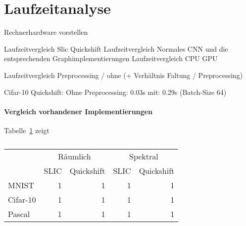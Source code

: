 \section{Laufzeitanalyse}
\label{laufzeitanalyse}

Rechnerhardware vorstellen

Laufzeitvergleich Slic Quickshift
Laufzeitvergleich Normales CNN und die entsprechenden Graphimplementierungen
Laufzeitvergleich CPU GPU

Laufzeitvergleich Preprocessing / ohne (+ Verhältnis Faltung / Preprocessing)

Cifar-10 Quickshift: Ohne Preprocessing: 0.03s
mit: 0.29s (Batch-Size 64)



\paragraph{Vergleich \bzgl{} vorhandener Implementierungen}
\label{vergleich_laufzeit}



Tabelle~\ref{tab:laufzeit_raeumlich_spektral} zeigt
\begin{table}[t]
\centering
\begin{tabular}{lrrrr}
  \toprule
  & \multicolumn{2}{c}{Räumlich} & \multicolumn{2}{c}{Spektral}\\
  \cmidrule{2-5}
  & \gls{SLIC} & Quickshift & \gls{SLIC} & Quickshift\\
  \midrule
  \gls{MNIST} & 1 & 1 & 1 & 1\\
  \gls{Cifar}-10 & 1 & 1 & 1 & 1\\
  \gls{Pascal} & 1 & 1 & 1 & 1\\
  \bottomrule
\end{tabular}
\caption[Laufzeiten der räumlichen und spektralen Vorverarbeitungsschritte]{}
\label{tab:laufzeit_raeumlich_spektral}
\end{table}

